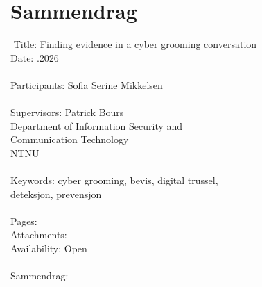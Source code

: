 \chapter*{Sammendrag}

\begin{tabbing}
\hspace{2cm}\=\hspace{1.5cm}\=\kill %
Title:          \>\>Finding evidence in a cyber grooming conversation \\
Date:           \>.2026 \\ 
\\
Participants:   \>\> Sofia Serine Mikkelsen \\
\\
Supervisors:    \> \> Patrick Bours \\
                \> \> Department of Information Security and \\           
                \> \> Communication Technology\\ 
                \> \> NTNU \\
\\ 
Keywords:       \>\> cyber grooming, bevis, digital trussel, \\
                \>\> deteksjon, prevensjon \\
\\
Pages:          \> \\
Attachments:    \> \\
Availability:   \>\> Open \\
\\


        
Sammendrag:
\end{tabbing}
